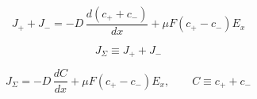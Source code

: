 \documentclass[border=2pt,math]{standalone}
\begin{document}
\begin{equation*}
J_{+} + J_{-}
= -D\,\frac{d(c_{+} + c_{-})}{dx}
  + \mu F(c_{+} - c_{-})E_x
\end{equation*}


\begin{equation*}
J_{\Sigma} \equiv J_{+} + J_{-}
\end{equation*}


\begin{equation*}
J_{\Sigma}
= -D\,\frac{dC}{dx}
  + \mu F(c_{+} - c_{-})E_x,
\qquad
C \equiv c_{+} + c_{-}
\end{equation*}
\end{document}
